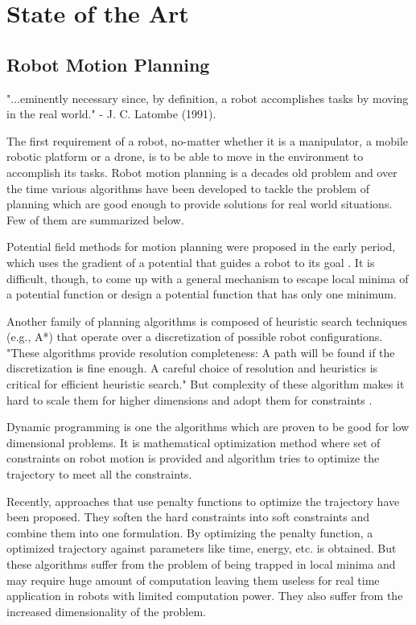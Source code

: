 
\chapter{State of the Art}

\section{Robot Motion Planning}
  
"...eminently necessary since, by definition, a robot accomplishes tasks by moving in the real world." - J. C. Latombe (1991). 

The first requirement of a robot, no-matter whether it is a manipulator, a mobile robotic platform or a drone, is to be able to move in the environment to accomplish its tasks. Robot motion planning is a decades old problem and over the time various algorithms have been developed to tackle the problem of planning which are good enough to provide  solutions for real world situations. Few of them are summarized below.

Potential field methods for motion planning were proposed in the early period, which uses the gradient of a potential that guides a robot to its goal \cite{khatib1986real}. It is difficult, though, to come up with a general mechanism to escape local minima of a potential function or design a potential function that has only one minimum. 

Another family of planning algorithms is composed of heuristic search techniques (e.g., A*) that operate over a discretization of possible robot configurations. "These algorithms provide resolution completeness: A path will be found if the discretization is fine enough. A careful choice of resolution and heuristics is critical for efficient heuristic search."\cite{kingston2018sampling} But complexity of these algorithm makes it hard to scale them for higher dimensions and adopt them for constraints \cite{kingston2018sampling}. 

Dynamic programming is one the algorithms which are proven to be good for low dimensional problems. It is mathematical optimization method where set of constraints on robot motion is provided and algorithm tries to optimize the trajectory to meet all the constraints. 

Recently, approaches that use penalty functions to optimize the trajectory have been proposed. They soften the hard constraints into soft constraints and combine them into one formulation. By optimizing the penalty function, a optimized trajectory against parameters like time, energy, etc. is obtained. But these algorithms suffer from the problem of being trapped in local minima and may require huge amount of computation leaving them useless for real time application in robots with limited computation power\cite{kingston2018sampling}. They also suffer from the increased dimensionality of the problem.
  
